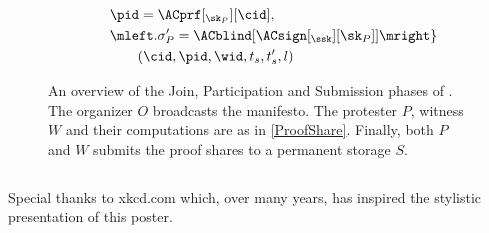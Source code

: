 \begin{columns}[t]
\begin{column}{0.32\linewidth}
\begin{figure}
\begin{minipage}{\linewidth}
\begin{align*}
          & \qquad \pid = \ACprf[_{\sk_P}][\cid], \\
          & \qquad \mleft. \sigma_P' = \ACblind[\ACsign[_{\ssk}][\sk_P]] \mright\} 
          \\
          & \qquad\qquad (\cid, \pid, \wid, t_s, t_s', l)
        \end{align*}
      \end{minipage}
      \caption{\label{Protocol}%
        An overview of the Join, Participation and Submission phases of \PRIVO.\@
        The organizer \(O\) broadcasts the manifesto.
        The protester \(P\), witness \(W\) and their computations are as in 
        \cref{ProofShare}.
        Finally, both \(P\) and \(W\) submits the proof shares to a permanent storage \(S\).
      }%
    \end{figure}

  \end{column}

\end{columns}

\vfill
\flushright{}
Special thanks to xkcd.com which, over many years, has inspired the stylistic 
presentation of this poster.
